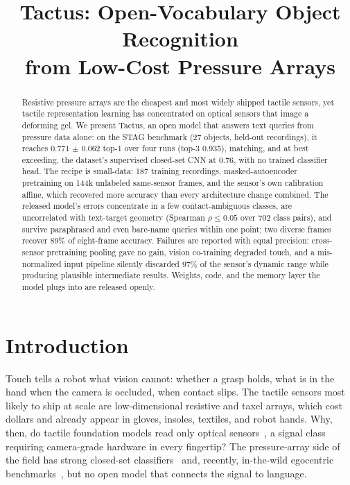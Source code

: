 \documentclass[conference]{IEEEtran}
\title{Tactus: Open-Vocabulary Object Recognition\\from Low-Cost Pressure Arrays}
\author{\IEEEauthorblockN{Abdul Basit Tonmoy}
\IEEEauthorblockA{Eximius Labs\\
\texttt{atonmoy27@wabash.edu}\\
\texttt{eximiuslabs.com}}}
\begin{document}
\maketitle

\begin{abstract}
Resistive pressure arrays are the cheapest and most widely shipped tactile sensors, yet
tactile representation learning has concentrated on optical sensors that image a deforming
gel. We present Tactus, an open model that answers text queries from pressure data alone:
on the STAG benchmark (27 objects, held-out recordings), it reaches 0.771 $\pm$ 0.062 top-1
over four runs (top-3 0.935), matching, and at best exceeding, the dataset's supervised
closed-set CNN at 0.76, with no trained classifier head. The recipe is small-data: 187
training recordings, masked-autoencoder pretraining on 144k unlabeled same-sensor frames,
and the sensor's own calibration affine, which recovered more accuracy than every
architecture change combined. The released model's errors concentrate in a few
contact-ambiguous classes, are uncorrelated with text-target geometry (Spearman
$\rho \le 0.05$ over 702 class pairs), and survive paraphrased and even bare-name queries
within one point; two diverse frames recover 89\% of eight-frame accuracy. Failures are
reported with equal precision: cross-sensor pretraining pooling gave no gain, vision
co-training degraded touch, and a mis-normalized input pipeline silently discarded 97\% of
the sensor's dynamic range while producing plausible intermediate results. Weights, code,
and the memory layer the model plugs into are released openly.
\end{abstract}

\section{Introduction}
Touch tells a robot what vision cannot: whether a grasp holds, what is in the hand when the
camera is occluded, when contact slips. The tactile sensors most likely to ship at scale
are low-dimensional resistive and taxel arrays, which cost dollars and already appear in
gloves, insoles, textiles, and robot hands. Why, then, do tactile foundation models read
only optical sensors~\cite{fu2024tvl,higuera2024sparsh,yang2024unitouch,zhao2025t3}, a
signal class requiring camera-grade hardware in every fingertip? The pressure-array side of
the field has strong closed-set classifiers~\cite{sundaram2019stag,lin2024stat} and,
recently, in-the-wild egocentric benchmarks~\cite{song2025opentouch}, but no open model
that connects the signal to language.
\end{document}
